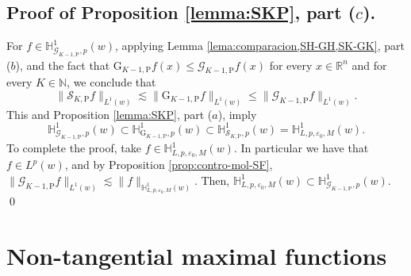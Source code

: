 \documentclass[11pt, a4paper,leqno]{amsart}
\theoremstyle{plain}
\theoremstyle{definition}
\theoremstyle{remark}
\numberwithin{equation}{section}
\def \R{ \mathbb{R} }
\def \N{ \mathbb{N} }
\def \Scal{ \mathcal{S} }
\def \pp{ \mathrm{P} }
\def \Gcal { \mathcal{G} }
\def \Grm{ \mathrm{G} }
\begin{document}
\subsection{Proof of Proposition \ref{lemma:SKP}, part ($c$).}
For  $f \in \mathbb{H}_{\Gcal_{K-1,\pp},p}^1(w)$, applying Lemma \ref{lema:comparacion,SH-GH,SK-GK}, part ($b$), and the fact that $\Grm_{K-1,\pp}f(x)\leq \Gcal_{K-1,\pp}f(x)$ for every $x\in \R^n$ and for every $K\in \N$, we conclude that
$$
\|\Scal_{K,\pp}f\|_{L^1(w)}\lesssim 
\|\Grm_{K-1,\pp}f\|_{L^1(w)}\leq \|\Gcal_{K-1,\pp}f\|_{L^1(w)}.
$$
This and Proposition \ref{lemma:SKP}, part ($a$), imply
$$
\mathbb{H}_{\Gcal_{K-1,\pp},p}^1(w)\subset 
\mathbb{H}_{\Grm_{K-1,\pp},p}^1(w)
\subset
\mathbb{H}_{\Scal_{K,\pp},p}^1(w)=\mathbb{H}_{L,p,\varepsilon_0,M}^1(w).
$$
To complete the proof, take $f\in \mathbb{H}_{L,p,\varepsilon_0,M}^1(w)$. In particular we have that $f\in L^p(w)$, and by Proposition \ref{prop:contro-mol-SF}, 
$
\|\Gcal_{K-1,\pp}f\|_{L^1(w)}\lesssim \|f\|_{\mathbb{H}_{L,p,\varepsilon_0,M}^1(w)}.
$
Then, $\mathbb{H}_{L,p,\varepsilon_0,M}^1(w)\subset \mathbb{H}_{\Gcal_{K-1,\pp},p}^1(w)$.
\qed




\section{Non-tangential maximal functions}\label{section:NT}
\end{document}
